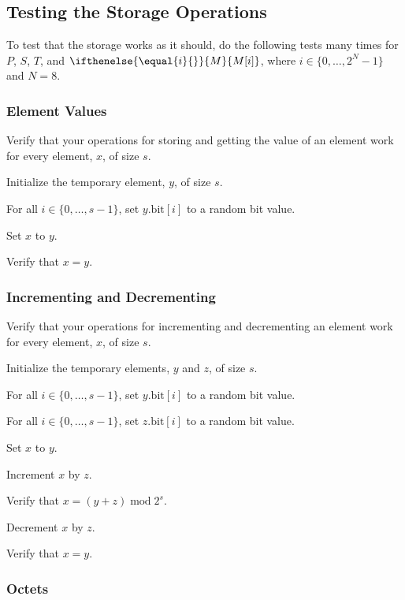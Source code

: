 \documentclass[a4paper,12pt]{article}
\newcommand{\MEM}[1]{\ifthenelse{\equal{#1}{}}{M}{M[#1]}}
\newcommand{\PC}{P}
\newcommand{\SP}{S}
\newcommand{\TERM}{T}
\newcommand{\bitno}[2]{#1.\mathrm{bit}[#2]}
\newcommand{\range}[2]{\{#1,\ldots,#2\}}
\DeclareMathOperator{\MOD}{mod}
\newcommand{\modulo}[2]{#1 \MOD #2}
\begin{document}
\subsection{Testing the Storage Operations}

To test that the storage works as it should, do the following tests many times for $\PC$, $\SP$, $\TERM$, and $\MEM{i}$, where $i \in \range{0}{2^N-1}$ and $N=8$.

\subsubsection{Element Values}

Verify that your operations for storing and getting the value of an element work for every element, $x$, of size $s$.
\begin{stepnumbers}
\item Initialize the temporary element, $y$, of size $s$.
\item For all $i \in \range{0}{s-1}$, set $\bitno{y}{i}$ to a random bit value.
\item Set $x$ to $y$.
\item Verify that $x = y$.
\end{stepnumbers}

\subsubsection{Incrementing and Decrementing}

Verify that your operations for incrementing and decrementing an element work for every element, $x$, of size $s$.
\begin{stepnumbers}
\item Initialize the temporary elements, $y$ and $z$, of size $s$.
\item For all $i \in \range{0}{s-1}$, set $\bitno{y}{i}$ to a random bit value.
\item For all $i \in \range{0}{s-1}$, set $\bitno{z}{i}$ to a random bit value.
\item Set $x$ to $y$.
\item Increment $x$ by $z$.
\item Verify that $x = \modulo{(y + z)}{2^s}$.
\item Decrement $x$ by $z$.
\item Verify that $x = y$.
\end{stepnumbers}

\subsubsection{Octets}
\end{document}
